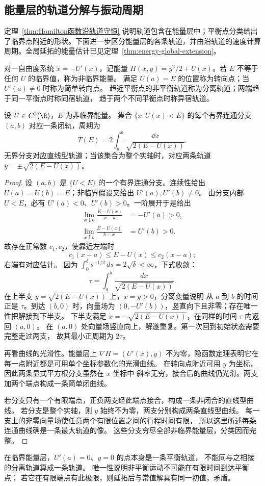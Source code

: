 \subsection*{能量层的轨道分解与振动周期}
\label{sec:energy-levels}
定理~\ref{thm:Hamilton函数沿轨道守恒} 说明轨道包含在能量层中；平衡点分类给出了临界点附近的形状。下面进一步区分能量层的各条轨道，并由沿轨道的速度计算周期。全局延拓的能量估计已见定理~\ref{thm:energy-global-extension}。
\begin{definition}
对一自由度系统 $\ddot x=-U'(x)$，记能量
$H(x,y)=y^2/2+U(x)$。若 $E$ 不等于任何 $U$ 的临界值，称为非临界能量。
满足 $U(a)=E$ 的位置称为转向点；当 $U'(a)\ne0$ 时称为简单转向点。
趋近平衡点的非平衡轨道称为分离轨道；两端趋于同一平衡点时称同宿轨道，
趋于两个不同平衡点时称异宿轨道。
\end{definition}
\begin{theorem}[非临界能量层]\label{thm:regular-energy-level}
设 $U\in C^2(\R)$，$E$ 为非临界能量。
集合 $\{x:U(x)<E\}$ 的每个有界连通分支 $(a,b)$ 对应一条闭轨，周期为
\[
 T(E)=2\int_a^b\frac{\dd x}{\sqrt{2(E-U(x))}}.
\]
无界分支对应直线型轨道；当该集合为整个实轴时，对应两条轨道
$y=\pm\sqrt{2(E-U(x))}$。
\end{theorem}
\begin{proof}
设 $(a,b)$ 是 $\{U<E\}$ 的一个有界连通分支。连续性给出
$U(a)=U(b)=E$；非临界假设又给出 $U'(a),U'(b)\ne0$。
由分支内部 $U<E$，必有 $U'(a)<0$、$U'(b)>0$。一阶展开于是给出
\[
 \begin{aligned}
 \lim_{x\downarrow a}\frac{E-U(x)}{x-a}&=-U'(a)>0,\\
 \lim_{x\uparrow b}\frac{E-U(x)}{b-x}&=U'(b)>0.
\end{aligned}
\]
故存在正常数 $c_1,c_2$，使靠近左端时
\[
 c_1(x-a)\leq E-U(x)\leq c_2(x-a);
\]
右端有对应估计。
因为 $\displaystyle\int_0^\delta s^{-1/2}\,ds=2\sqrt\delta<\infty$，下式收敛：
\[
 \tau=\int_a^b\frac{dx}{\sqrt{2(E-U(x))}}.
\]
在上半支 $y=\sqrt{2(E-U(x))}$ 上，$\dot x=y>0$，分离变量说明
从 $a$ 到 $b$ 的时间正是 $\tau$。到达 $(b,0)$ 时，向量场为
$(0,-U'(b))$，竖直向下且非零；存在唯一性把解接到下半支。
下半支满足 $\dot x=-\sqrt{2(E-U(x))}$，在同样的时间 $\tau$ 内返回 $(a,0)$。
在 $(a,0)$ 处向量场竖直向上，解遂重复。第一次回到初始状态需要完整走过两支，
故其最小正周期为 $2\tau$。

再看曲线的光滑性。能量层上
$\nabla H=(U'(x),y)$ 不为零，隐函数定理表明它在每一点附近都是可用单个坐标参数化的光滑曲线。
在转向点附近可用 $y$ 为坐标，因此两条显式平方根分支虽然在 $x$ 坐标中
斜率无穷，接合后的曲线仍光滑。两支加两个端点构成一条简单闭曲线。

若分支只有一个有限端点，正负两支经此端点接合，构成一条非闭合的直线型曲线。
若分支是整个实轴，则 $y$ 始终不为零，两支分别构成两条直线型曲线。
每一支上的非零向量场使任意两个有限位置之间的行程时间有限，
所以这里所述每条连通曲线确是一条最大轨道的像。
这些分支穷尽全部非临界能量层，分类因而完整。
\end{proof}
在临界能量层，$U'(a)=0$、$y=0$ 的点本身是一条平衡轨道，
不能同与之相接的分离轨道算成一条轨道。
唯一性说明非平衡运动不可能在有限时间到达平衡点；
若它在有限端点有此极限，则延拓后与常值解具有同一初值，矛盾。


